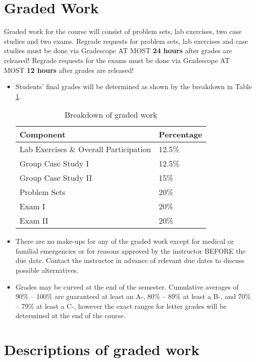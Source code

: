 \documentclass[11pt, a4paper]{article}
\begin{document}
\section{Graded Work} 
Graded work for the course will consist of problem sets, lab exercises, two case studies and two exams. Regrade requests for problem sets, lab exercises and case studies must be done via Gradescope AT MOST \textbf{24 hours} after grades are released! Regrade requests for the exams must be done via Gradescope AT MOST \textbf{12 hours} after grades are released!
\begin{itemize}[label= {\color{darkblue}{\ArrowBoldRightStrobe}}]
		\item Students' final grades will be determined as shown by the breakdown in Table \ref{gradedwork}.
	\begin{table}[h]
		\centering
		\caption{Breakdown of graded work} \label{gradedwork}
		\begin{tabular}{ll}
			Component & Percentage \\ 
			\hline
			Lab Exercises \& Overall Participation & 12.5\% \\
			Group Case Study I & 12.5\% \\
			Group Case Study II & 15\% \\
			Problem Sets & 20\% \\
			Exam I & 20\% \\ 
			Exam II & 20\% \\
			\hline 
		\end{tabular}
	\end{table}
	
	\item There are no make-ups for any of the graded work except for medical or familial emergencies or for reasons approved by the instructor BEFORE the due date. Contact the instructor in advance of relevant due dates to discuss possible alternatives. 
	
	\item Grades may be curved at the end of the semester. Cumulative averages of 90\% -- 100\% are guaranteed at least an A-, 80\% -- 89\% at least a B-, and 70\% -- 79\% at least a C-, however the exact ranges for letter grades will be determined at the end of the course.
\end{itemize}


\section{Descriptions of graded work}
\end{document}
